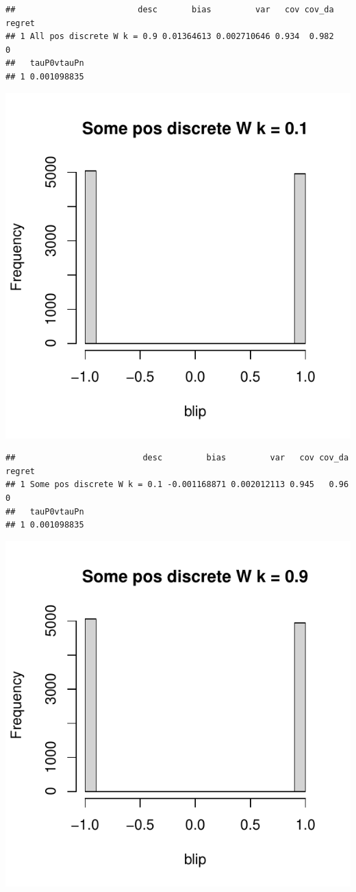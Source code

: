 \documentclass[11pt]{article}\usepackage[]{graphicx}\usepackage[table]{xcolor}
\makeatletter
\def\maxwidth{ %
  \ifdim\Gin@nat@width>\linewidth
    \linewidth
  \else
    \Gin@nat@width
  \fi
}
\newenvironment{kframe}{%
 \def\at@end@of@kframe{}%
 \ifinner\ifhmode%
  \def\at@end@of@kframe{\end{minipage}}%
  \begin{minipage}{\columnwidth}%
 \fi\fi%
 \def\FrameCommand##1{\hskip\@totalleftmargin \hskip-\fboxsep
 \colorbox{shadecolor}{##1}\hskip-\fboxsep
     \hskip-\linewidth \hskip-\@totalleftmargin \hskip\columnwidth}%
 \MakeFramed {\advance\hsize-\width
   \@totalleftmargin\z@ \linewidth\hsize
   \@setminipage}}%
 {\par\unskip\endMakeFramed%
 \at@end@of@kframe}
\newenvironment{knitrout}{}{} %
\makeatother
\begin{document}
\begin{knitrout}
\begin{kframe}\begin{verbatim}
##                         desc       bias         var   cov cov_da regret
## 1 All pos discrete W k = 0.9 0.01364613 0.002710646 0.934  0.982      0
##   tauP0vtauPn
## 1 0.001098835
\end{verbatim}
\end{kframe}
\includegraphics[width=\maxwidth]{figure/unnamed-chunk-4-3} 
\begin{kframe}\begin{verbatim}
##                          desc         bias         var   cov cov_da regret
## 1 Some pos discrete W k = 0.1 -0.001168871 0.002012113 0.945   0.96      0
##   tauP0vtauPn
## 1 0.001098835
\end{verbatim}
\end{kframe}
\includegraphics[width=\maxwidth]{figure/unnamed-chunk-4-4} 

\end{knitrout}
\end{document}
